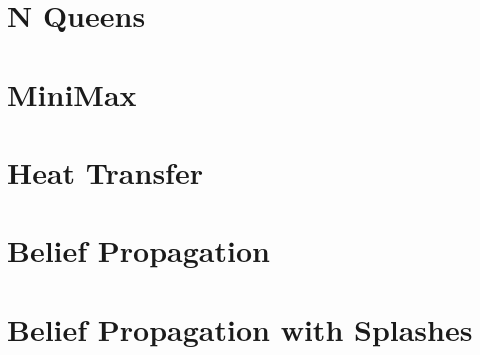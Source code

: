 
\section{N Queens}

\section{MiniMax}

\section{Heat Transfer}

\section{Belief Propagation}

\section{Belief Propagation with Splashes}
